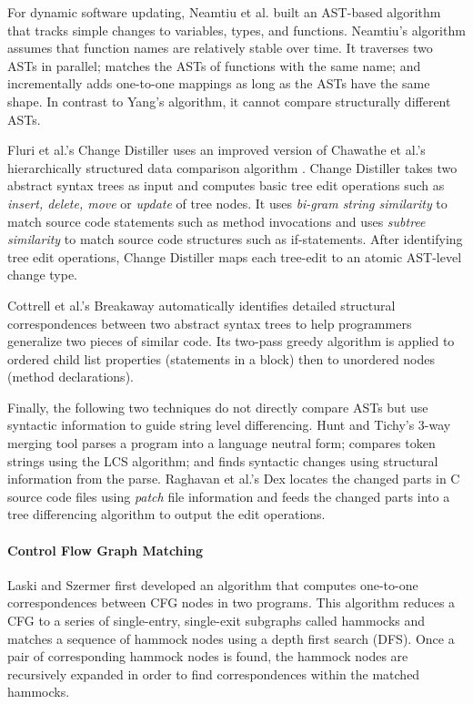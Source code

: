 \documentclass[runningheads,a4paper]{llncs}
\begin{document}
For dynamic software updating, Neamtiu et al. \cite{Neamtiu2005} built an AST-based algorithm that tracks simple changes to variables, types, and functions. Neamtiu's algorithm assumes that function names are relatively stable over time. 
It
traverses two ASTs in parallel;
matches the ASTs of functions with the same name; 
and incrementally adds one-to-one mappings as long as the ASTs have the same shape. In contrast to Yang's algorithm, it cannot compare structurally different ASTs. 

Fluri et al.'s Change Distiller \cite{Fluri2007} uses an improved version of Chawathe et al.'s hierarchically structured data comparison algorithm \cite{Chawathe1996}. Change Distiller takes two abstract syntax trees as input and computes basic tree edit operations such as {\it insert, delete, move} or {\it update} of tree nodes. It uses {\it bi-gram string similarity} to match source code statements such as method invocations and uses {\it subtree similarity} to match source code structures such as if-statements. After identifying tree edit operations, Change Distiller maps each tree-edit to an atomic AST-level change type. 

Cottrell et al.'s Breakaway \cite{Cottrell2007} automatically identifies detailed structural correspondences between two abstract syntax trees to help programmers generalize two pieces of similar code. Its two-pass greedy algorithm is applied to ordered child list properties (statements in a block) then to unordered nodes (method declarations). 

Finally, the following two techniques do not directly compare ASTs but use syntactic information to guide string level differencing. 
Hunt and Tichy's 3-way merging tool \cite{Hunt2002} parses a program into a language neutral form; compares token strings using the LCS algorithm; and finds syntactic changes using structural information from the parse.
Raghavan et al.'s Dex \cite{Raghavan2004} locates the changed parts in C source code files using {\it patch} file information and feeds the changed parts into a tree differencing algorithm to output the edit operations. 


\paragraph{Control Flow Graph Matching}
Laski and Szermer \cite{Laski1992} first developed an algorithm that computes one-to-one correspondences between CFG nodes in two programs. This algorithm reduces a CFG to a series of single-entry, single-exit subgraphs called hammocks and matches a sequence of hammock nodes using a depth first search (DFS). Once a pair of corresponding hammock nodes is found, the hammock nodes are recursively expanded in order to find correspondences within the matched hammocks. 
 
\end{document}
